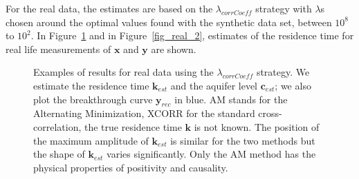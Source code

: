 \documentclass[]{elsarticle} %
\begin{document}
For the real data, the estimates are based on the  $\lambda_{corrCoeff}$ strategy with $\lambda$s chosen around the optimal values found with the synthetic data set, between $10^{8}$ to $10^{2}$.
In Figure~\ref{fig_real} and in Figure~\ref{fig_real_2}, estimates of the residence time for real life measurements of $\textbf{x}$ and $\textbf{y}$ are shown. 

\begin{figure}[H]
    \centering
    \caption{Examples of results for real data using the  $\lambda_{corrCoeff}$ strategy. We estimate the residence time $\textbf{k}_{est}$ and the aquifer level $\textbf{c}_{est}$; we also plot the breakthrough curve $\textbf{y}_{rec}$ in blue. AM stands for the Alternating Minimization, XCORR for the standard cross-correlation, the true residence time $\textbf{k}$ is not known. The position of the maximum amplitude of $\textbf{k}_{est}$ is similar for the two methods but the shape of $\textbf{k}_{est}$ varies significantly. Only the AM method has the physical properties of positivity and causality.}
    \label{fig_real}
\end{figure}
\end{document}
